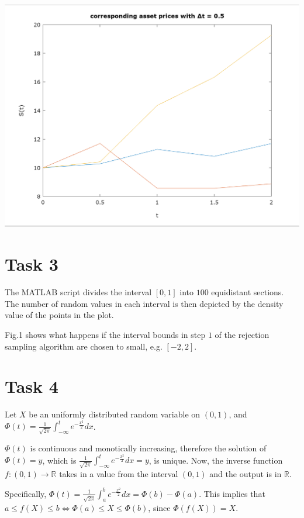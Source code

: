 \documentclass[10pt,a4paper]{article}
\begin{document}
\begin{center}
\includegraphics[scale=0.5]{asset_05.jpeg}		
\end{center}	

\section*{Task 3}

The MATLAB script divides the interval $[0,1]$ into $100$ equidistant sections. The number of random values in each interval is then depicted by the density value of the points in the plot.

Fig.1 shows what happens if the interval bounds in step $1$ of the rejection sampling algorithm are chosen to small, e.g. $[-2,2]$.  


\section*{Task 4}

Let $X$ be an uniformly distributed random variable on $(0,1)$, and $\Phi(t)=\frac{1}{\sqrt{2 \pi}}\int_{-\infty}^{t}e^{-\frac{x^2}{2}}dx$.
 
$\Phi(t)$ is continuous and monotically increasing, therefore the solution of $\Phi(t)=y$, which is $\frac{1}{\sqrt{2 \pi}}\int_{-\infty}^{t}e^{-\frac{x^2}{2}}dx=y$, is unique. Now, the inverse function $f:(0,1)\rightarrow \mathbb{R}$ takes in a value from the interval $(0,1)$ and the output is in $\mathbb{R}$.

Specifically, $\Phi(t)=\frac{1}{\sqrt{2 \pi}}\int_{a}^{b}e^{-\frac{x^2}{2}}dx=\Phi(b)-\Phi(a)$. This implies that $a\leq f(X) \leq b \Leftrightarrow \Phi(a)\leq X \leq \Phi(b)$, since $\Phi(f(X))=X$.
\end{document}
